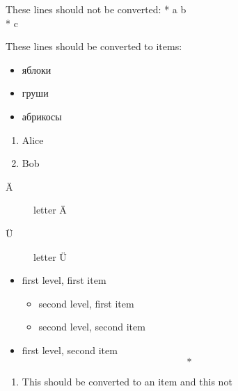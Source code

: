 These lines should not be converted:
* a
\* b
\\* c


These lines should be converted to items:
\begin{itemize}
  \item яблоки
  \item груши
  \item абрикосы
\end{itemize}

\begin{enumerate}
  \item Alice
  \item Bob
\end{enumerate}

\begin{description}
  \item [Ä] letter Ä
  \item [Ü] letter Ü
\end{description}


\begin{itemize}
  \item first level, first item
    \begin{itemize}
      \item second level, first item
      \item second level, second item
    \end{itemize}
  \item first level, second item
    \begin{equation}
      * %
    \end{equation}
\end{itemize}


\begin{enumerate}
  \item This should be converted to an item
  \* and this not
\end{enumerate}
